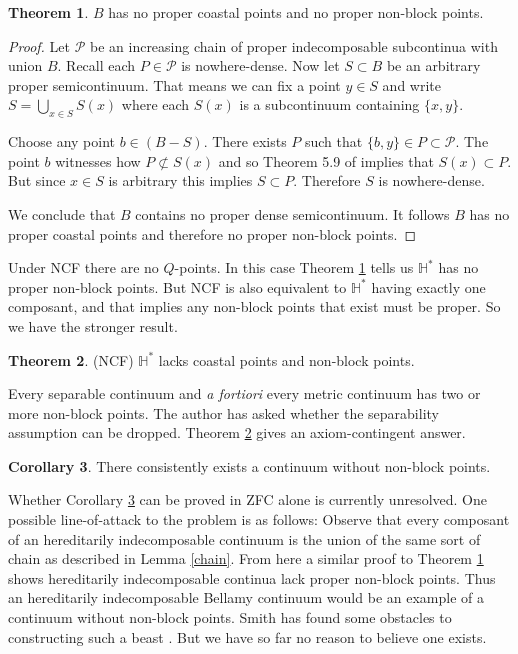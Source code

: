 \documentclass[12pt]{article}
\theoremstyle{plain}
\theoremstyle{definition}
\newtheorem{theorem}{Theorem}[section]
\newtheorem{corollary}[theorem]{Corollary}
\newcommand{\HH}{\ensuremath{\mathbb H}}
\newcommand{\0}{\ensuremath{\varnothing}}
\newcommand{\cP}{\ensuremath{\mathcal P}}
\begin{document}
	\begin{theorem} \label{noQ}
		$B$ has no proper coastal points and no proper non-block points.
	\end{theorem}
	
	\begin{proof}
		Let $\cP$ be an increasing chain of proper indecomposable subcontinua with union $B$.
		Recall each $P \in \cP$ is nowhere-dense. Now let $S \subset B$ be an arbitrary proper semicontinuum. 
		That means we can fix a point $y \in S$ and write $S = \bigcup_{x \in S} S(x)$ 
		where each $S(x)$ is a subcontinuum containing $\{x,y\}$.
		
		
		Choose any point $b \in (B-S)$. There exists $P$ such that $\{b,y\} \in P \subset \cP$. 
		The point $b$ witnesses how $P \not \subset S(x)$ and so Theorem 5.9 of \cite{CS1} 
		implies that $S(x) \subset P$. But since $x \in S$ is arbitrary this implies $S \subset P$. 
		Therefore $S$ is nowhere-dense.
		
		We conclude that $B$ contains no proper dense semicontinuum. 
		It follows $B$ has no proper coastal points and therefore no proper non-block points.
	\end{proof}
	
	
	Under NCF there are no $Q$-points. In this case Theorem \ref{noQ} tells us $\HH^*$ has no proper non-block points. But NCF is also equivalent to $\HH^*$ having exactly one composant, and that implies any non-block points that exist must be proper. So we have the stronger result.
	
	\begin{theorem} \label{big}
		(NCF) $\HH^*$ lacks coastal points and non-block points.
	\end{theorem}
	
	
	Every separable continuum and {\it a fortiori} every metric continuum has two or more non-block points. The author has asked whether the separability assumption can be dropped. Theorem \ref{big} gives an axiom-contingent answer. 
	
	\begin{corollary} \label{con}There consistently exists a continuum without non-block points.\end{corollary}
	
	Whether Corollary \ref{con} can be proved in ZFC alone is currently unresolved. 
	One possible line-of-attack to the problem is as follows: 
	Observe that every composant of an hereditarily indecomposable continuum is the union of the same sort of chain as described in Lemma \ref{chain}. 
	From here a similar proof to Theorem \ref{noQ} shows hereditarily indecomposable continua lack proper non-block points. 
	Thus an hereditarily indecomposable Bellamy continuum would be an example of a continuum without non-block points. 
	Smith has found some obstacles to constructing such a beast \cite{SmithHIRemainderProd,SmithHILexProd,SmithHISouslinArcsIL,SmithHISouslinProd}. 
	But we have so far no reason to believe one exists.
	
\end{document}
